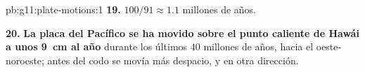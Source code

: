 \begin{solution}{pb:g11:plate-motions:1}
\textbf{19.} $100/91 \approx 1.1$ millones de años.

\textbf{20.} \textbf{La placa del Pacífico se ha movido sobre el punto caliente
de Hawái a unos \qty{9}{cm} al año} durante los últimos 40 millones de años,
hacia el oeste-noroeste; antes del codo se movía más despacio, y en otra
dirección.
\end{solution}
